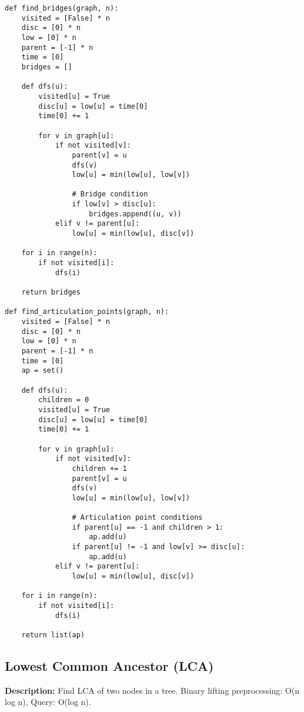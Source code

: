 \begin{lstlisting}
def find_bridges(graph, n):
    visited = [False] * n
    disc = [0] * n
    low = [0] * n
    parent = [-1] * n
    time = [0]
    bridges = []
    
    def dfs(u):
        visited[u] = True
        disc[u] = low[u] = time[0]
        time[0] += 1
        
        for v in graph[u]:
            if not visited[v]:
                parent[v] = u
                dfs(v)
                low[u] = min(low[u], low[v])
                
                # Bridge condition
                if low[v] > disc[u]:
                    bridges.append((u, v))
            elif v != parent[u]:
                low[u] = min(low[u], disc[v])
    
    for i in range(n):
        if not visited[i]:
            dfs(i)
    
    return bridges

def find_articulation_points(graph, n):
    visited = [False] * n
    disc = [0] * n
    low = [0] * n
    parent = [-1] * n
    time = [0]
    ap = set()
    
    def dfs(u):
        children = 0
        visited[u] = True
        disc[u] = low[u] = time[0]
        time[0] += 1
        
        for v in graph[u]:
            if not visited[v]:
                children += 1
                parent[v] = u
                dfs(v)
                low[u] = min(low[u], low[v])
                
                # Articulation point conditions
                if parent[u] == -1 and children > 1:
                    ap.add(u)
                if parent[u] != -1 and low[v] >= disc[u]:
                    ap.add(u)
            elif v != parent[u]:
                low[u] = min(low[u], disc[v])
    
    for i in range(n):
        if not visited[i]:
            dfs(i)
    
    return list(ap)
\end{lstlisting}

\subsection{Lowest Common Ancestor (LCA)}
\textbf{Description:} Find LCA of two nodes in a tree. Binary lifting preprocessing: O(n log n), Query: O(log n).

